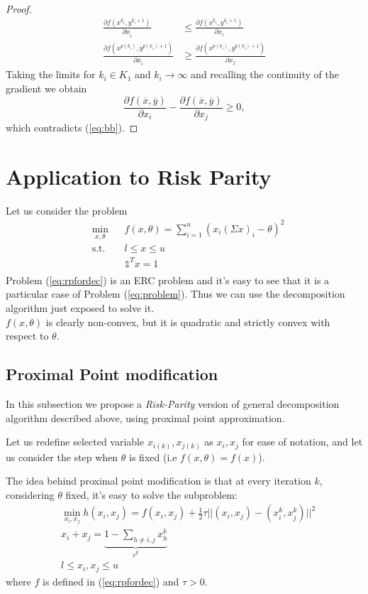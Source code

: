 \begin{proof}
\begin{equation}
\begin{aligned}
 \frac{\partial f(x^{k_i},y^{k_i+1})}{\partial x_{\hat i}} &\le \frac{\partial f(x^{k_i},y^{k_i+1})}{\partial x_{i}}\\
 \frac{\partial f(x^{p(k_i)},y^{p(k_i)+1})}{\partial x_{\hat i}} &\ge \frac{\partial f(x^{p(k_i)},y^{p(k_i)+1})}{\partial x_{j}}
 \end{aligned}
\end{equation}
Taking the limits for $k_i\in K_1$ and $k_i\to\infty$ and recalling the continuity of the gradient we obtain
$$
 \frac{\partial f(\overline{x},\overline{y})}{\partial x_i} - \frac{\partial f(\overline{x},\overline{y})}{\partial x_{j}} \ge 0,
$$
which contradicts (\ref{eq:bb}).
\end{proof}

\section{Application to Risk Parity}
Let us consider the problem
\begin{equation}\label{eq:rpfordec}
\begin{aligned}
& \underset{x, \theta}{\text{min}}
&&f(x,\theta)=\sum_{i=1}^n \left(x_i (\Sigma x)_i - \theta\right)^2\\
& \text{s.t.}
&& l \leq x \leq u\\
&&& \mathds{1}^T x = 1 \\
\end{aligned}
\end{equation}
Problem (\ref{eq:rpfordec}) is an ERC problem and it's easy to see that it is a particular case of Problem (\ref{eq:problem}). Thus we can use the decomposition algorithm just exposed to solve it.\\
$f(x,\theta)$ is clearly non-convex, but it is quadratic and strictly convex with respect to $\theta$.

\subsection{Proximal Point modification}
In this subsection we propose a \emph{Risk-Parity} version of general decomposition algorithm described above, using proximal point approximation.

Let us redefine selected variable $x_{i(k)},x_{j(k)}$ as $x_{i},x_{j}$ for ease of notation, and let us consider the step when $\theta$ is fixed (i.e $f(x,\theta)=f(x)$).

The idea behind proximal point modification is that at every iteration $k$, considering $\theta$ fixed, it's easy to solve the subproblem:
\begin{align}
 &\min_{x_i,x_j}h(x_i,x_j)= f(x_i,x_j)+ \frac{1}{2} \tau||(x_i,x_j)-(x_i^k,x_j^k)||^2\\
 &x_i+x_j = \underbrace{1-\sum_{h \ne i,j} x^k_h}_{c^k}\\
 &l \le x_i,x_j\le u
 \end{align}
where $f$ is defined in (\ref{eq:rpfordec}) and $\tau>0$.

